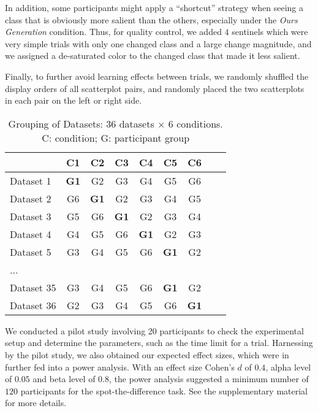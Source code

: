 In addition, some participants might apply a ``shortcut'' strategy when seeing a class that is obviously more salient than the others, especially under the \emph{Ours Generation} condition. Thus, for quality control, we added $4$ sentinels which were very simple trials with only one changed class and a large change magnitude, and we assigned a de-saturated color to the changed class that made it less salient.

Finally, to further avoid learning effects between trials, we randomly shuffled the display orders of all scatterplot pairs, and randomly placed the two scatterplots in each pair on the left or right side.

\begin{table}[ht]
\renewcommand\arraystretch{1}
\centering
\caption{Grouping of Datasets: $36$ datasets $\times$ $6$ conditions. C: condition; G: participant group}
\label{tab:latinsquare}
\begin{tabular}{lcccccccc}
\hline
 & C1 & C2 & C3  & C4 & C5 & C6 \\

\hline
Dataset 1 & \textbf{G1} & G2 & G3  & G4 & G5 & G6 \\
Dataset 2 & G6 & \textbf{G1} & G2 & G3  & G4 & G5 \\
Dataset 3 & G5  & G6 & \textbf{G1} & G2 & G3 & G4 \\
Dataset 4 & G4 & G5  & G6 & \textbf{G1} & G2 & G3 \\
Dataset 5 & G3 & G4 & G5  & G6 & \textbf{G1} & G2 \\
... & & & & & & &\\
Dataset 35 & G3 & G4 & G5  & G6 & \textbf{G1} & G2 \\
Dataset 36 & G2 & G3  & G4 & G5 & G6 & \textbf{G1}  \\

\hline
\end{tabular}
\end{table}

\vspace{.3em}
We conducted a pilot study involving 20 participants to check the experimental setup and determine the parameters, such as the time limit for a trial.
Harnessing by the pilot study, we also obtained our expected effect sizes, which were in further fed into a power analysis. With an effect size Cohen's $d$ of $0.4$, alpha level of $0.05$ and beta level of $0.8$, the power analysis suggested a minimum number of $120$ participants for the spot-the-difference task. See the supplementary material for more details.

